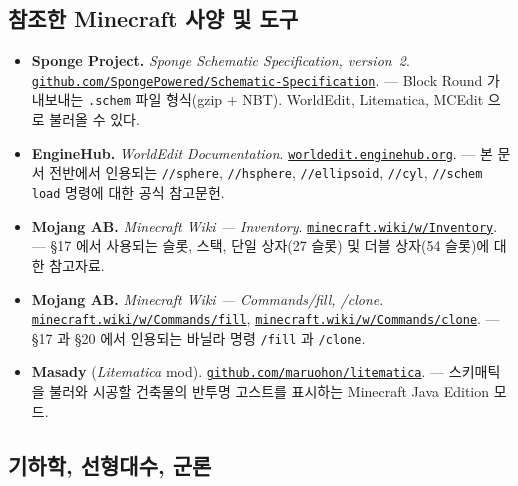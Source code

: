 \documentclass[12pt,a4paper]{scrartcl}
\newcommand{\code}[1]{\texttt{\small #1}}
\newcommand{\cmd}[1]{\textcolor{earth}{\texttt{\small #1}}}
\newcommand{\biblink}[2]{\href{#1}{\nolinkurl{#2}}}
\begin{document}
\subsection*{참조한 Minecraft 사양 및 도구}

\begin{itemize}[leftmargin=1.4em,itemsep=0.3em,topsep=0.3em]
  \item \textbf{Sponge Project.} \emph{Sponge Schematic Specification, version~2}.
        \biblink{https://github.com/SpongePowered/Schematic-Specification}{github.com/SpongePowered/Schematic-Specification}.
        --- Block Round 가 내보내는 \code{.schem} 파일 형식(gzip + NBT). WorldEdit, Litematica, MCEdit 으로 불러올 수 있다.

  \item \textbf{EngineHub.} \emph{WorldEdit Documentation}.
        \biblink{https://worldedit.enginehub.org/}{worldedit.enginehub.org}.
        --- 본 문서 전반에서 인용되는 \cmd{//sphere}, \cmd{//hsphere}, \cmd{//ellipsoid}, \cmd{//cyl}, \cmd{//schem load} 명령에 대한 공식 참고문헌.

  \item \textbf{Mojang AB.} \emph{Minecraft Wiki --- Inventory}.
        \biblink{https://minecraft.wiki/w/Inventory}{minecraft.wiki/w/Inventory}.
        --- §17 에서 사용되는 슬롯, 스택, 단일 상자(27 슬롯) 및 더블 상자(54 슬롯)에 대한 참고자료.

  \item \textbf{Mojang AB.} \emph{Minecraft Wiki --- Commands/fill, /clone}.
        \biblink{https://minecraft.wiki/w/Commands/fill}{minecraft.wiki/w/Commands/fill},
        \biblink{https://minecraft.wiki/w/Commands/clone}{minecraft.wiki/w/Commands/clone}.
        --- §17 과 §20 에서 인용되는 바닐라 명령 \cmd{/fill} 과 \cmd{/clone}.

  \item \textbf{Masady} (\emph{Litematica} mod).
        \biblink{https://github.com/maruohon/litematica}{github.com/maruohon/litematica}.
        --- 스키매틱을 불러와 시공할 건축물의 반투명 고스트를 표시하는 Minecraft Java Edition 모드.
\end{itemize}

\subsection*{기하학, 선형대수, 군론}
\end{document}
